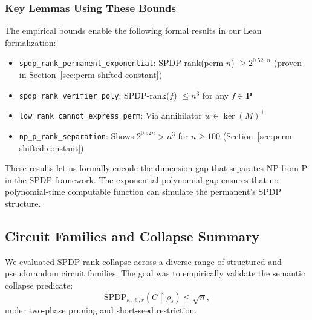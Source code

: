 \documentclass[12pt]{article}
\theoremstyle{definition}
\theoremstyle{definition}
\theoremstyle{remark}
\theoremstyle{remark}
\begin{document}
\subsubsection{Key Lemmas Using These Bounds}

The empirical bounds enable the following formal results in our Lean formalization:
\begin{itemize}
\item \texttt{spdp\_rank\_permanent\_exponential}: SPDP-rank(perm $n$) $\geq 2^{0.52 \cdot n}$ (proven in Section~\ref{sec:perm-shifted-constant})
\item \texttt{spdp\_rank\_verifier\_poly}: SPDP-rank($f$) $\leq n^3$ for any $f \in \mathbf{P}$
\item \texttt{low\_rank\_cannot\_express\_perm}: Via annihilator $w \in \ker(M)^\perp$
\item \texttt{np\_p\_rank\_separation}: Shows $2^{0.52n} > n^3$ for $n \geq 100$ (Section~\ref{sec:perm-shifted-constant})
\end{itemize}

These results let us formally encode the dimension gap that separates NP from P in the SPDP framework. The exponential-polynomial gap ensures that no polynomial-time computable function can simulate the permanent's SPDP structure.

\vspace{0.5cm}
\noindent{}

\subsection{Circuit Families and Collapse Summary}

We evaluated SPDP rank collapse across a diverse range of structured and pseudorandom circuit families. The goal was to empirically validate the semantic collapse predicate:
\begin{equation}
\text{SPDP}_{\kappa,\ell,r}(C \restriction \rho_s) \leq \sqrt{n},
\end{equation}
under two-phase pruning and short-seed restriction.
\end{document}
